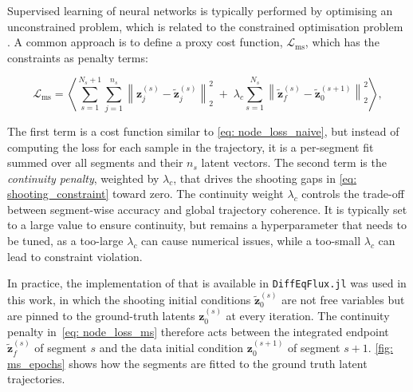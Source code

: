 Supervised learning of neural networks is typically performed by optimising an unconstrained problem, which is related to the constrained optimisation problem \cite{Turan2022}. A common approach is to define a proxy cost function, $\mathcal{L}_{\text{ms}}$, which has the constraints as penalty terms:

\begin{equation}\label{eq: node_loss_ms}
    \mathcal{L}_{\text{ms}}
    = \left\langle
        \sum_{s=1}^{N_{s}+1} \sum_{j=1}^{n_s}
            \left\| \mathbf{z}^{(s)}_j - \tilde{\mathbf{z}}^{(s)}_j \right\|_2^2
        \;+\; \lambda_c \sum_{s=1}^{N_{s}}
            \left\| \tilde{\mathbf{z}}^{(s)}_f - \tilde{\mathbf{z}}^{(s+1)}_0 \right\|_2^2
      \right\rangle ,
\end{equation}

The first term is a cost function similar to \ref{eq: node_loss_naive}, but instead of computing the loss for each sample in the trajectory, it is a per-segment fit summed over all segments and their $n_s$ latent vectors. The second term is the \emph{continuity penalty}, weighted by $\lambda_c$, that drives the shooting gaps in \autoref{eq: shooting_constraint} toward zero. The continuity weight $\lambda_c$ controls the trade-off between segment-wise accuracy and global trajectory coherence. It is typically set to a large value to ensure continuity, but remains a hyperparameter that needs to be tuned, as a too-large $\lambda_c$ can cause numerical issues, while a too-small $\lambda_c$ can lead to constraint violation. 

In practice, the implementation of \textcite{Turan2022} that is available in \texttt{DiffEqFlux.jl} was used in this work, in which the shooting initial conditions $\tilde{\mathbf{z}}^{(s)}_0$ are not free variables but are pinned to the ground-truth latents $\mathbf{z}^{(s)}_0$ at every iteration.  The continuity penalty in~\eqref{eq: node_loss_ms} therefore acts between the integrated endpoint $\tilde{\mathbf{z}}^{(s)}_f$ of segment $s$ and the data initial condition $\mathbf{z}^{(s+1)}_0$ of segment $s{+}1$. \autoref{fig: ms_epochs} shows how the segments are fitted to the ground truth latent trajectories. 


